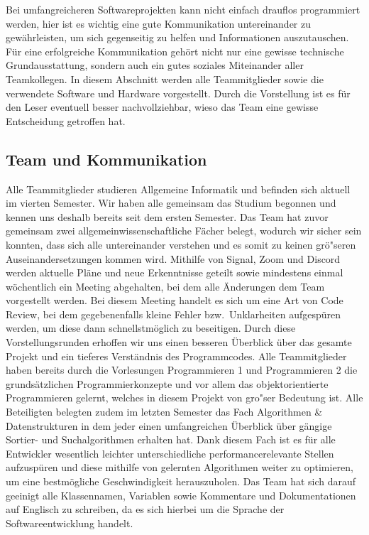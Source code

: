 Bei umfangreicheren Softwareprojekten kann nicht einfach drauflos programmiert werden, hier ist es wichtig eine gute Kommunikation untereinander zu gew\"ahrleisten, um sich gegenseitig zu helfen und Informationen auszutauschen.
F\"ur eine erfolgreiche Kommunikation geh\"ort nicht nur eine gewisse technische Grundausstattung, sondern auch ein gutes soziales Miteinander aller Teamkollegen.
In diesem Abschnitt werden alle Teammitglieder sowie die verwendete Software und Hardware vorgestellt.
Durch die Vorstellung ist es f\"ur den Leser eventuell besser nachvollziehbar, wieso das Team eine gewisse Entscheidung getroffen hat.

\subsection{Team und Kommunikation}\label{subsec:team-und-kommunikation}
Alle Teammitglieder studieren Allgemeine Informatik und befinden sich aktuell im vierten Semester.
Wir haben alle gemeinsam das Studium begonnen und kennen uns deshalb bereits seit dem ersten Semester.
Das Team hat zuvor gemeinsam zwei allgemeinwissenschaftliche F\"acher belegt, wodurch wir sicher sein konnten, dass sich alle untereinander verstehen und es somit zu keinen gr\"o"seren Auseinandersetzungen kommen wird.
Mithilfe von Signal, Zoom und Discord werden aktuelle Pl\"ane und neue Erkenntnisse geteilt sowie mindestens einmal w\"ochentlich ein Meeting abgehalten, bei dem alle \"Anderungen dem Team vorgestellt werden.
Bei diesem Meeting handelt es sich um eine Art von Code Review, bei dem gegebenenfalls kleine Fehler bzw.\ Unklarheiten aufgesp\"uren werden, um diese dann schnellstm\"oglich zu beseitigen.
Durch diese Vorstellungsrunden erhoffen wir uns einen besseren \"Uberblick \"uber das gesamte Projekt und ein tieferes Verst\"andnis des Programmcodes.
Alle Teammitglieder haben bereits durch die Vorlesungen Programmieren 1 und Programmieren 2 die grunds\"atzlichen Programmierkonzepte und vor allem das objektorientierte Programmieren gelernt, welches in diesem Projekt von gro"ser Bedeutung ist.
Alle Beteiligten belegten zudem im letzten Semester das Fach Algorithmen \& Datenstrukturen in dem jeder einen umfangreichen \"Uberblick \"uber g\"angige Sortier- und Suchalgorithmen erhalten hat.
Dank diesem Fach ist es f\"ur alle Entwickler wesentlich leichter unterschiedliche performancerelevante Stellen aufzusp\"uren und diese mithilfe von gelernten Algorithmen weiter zu optimieren, um eine bestm\"ogliche Geschwindigkeit herauszuholen.
Das Team hat sich darauf geeinigt alle Klassennamen, Variablen sowie Kommentare und Dokumentationen auf Englisch zu schreiben, da es sich hierbei um die Sprache der Softwareentwicklung handelt.
